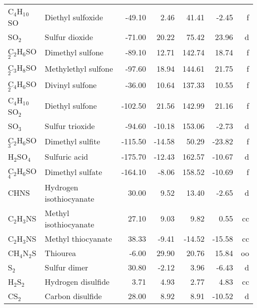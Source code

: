 \begin{table}
\begin{center}
\begin{tabular}{llrrrrr}
 C$_4$H$_1$$_0$SO     & Diethyl sulfoxide               &   -49.10    &     2.46  &    41.41  &    -2.45  &      f\\
 SO$_2$         & Sulfur dioxide                  &   -71.00    &    20.22  &    75.42  &    23.96  &      d\\
 C$_2$H$_6$SO$_2$     & Dimethyl sulfone                &   -89.10    &    12.71  &   142.74  &    18.74  &      f\\
 C$_3$H$_8$SO$_2$     & Methylethyl sulfone             &   -97.60    &    18.94  &   144.61  &    21.75  &      f\\
 C$_4$H$_6$SO$_2$     & Divinyl sulfone                 &   -36.00    &    10.64  &   137.33  &    10.55  &      f\\
 C$_4$H$_1$$_0$SO$_2$    & Diethyl sulfone                 &  -102.50    &    21.56  &   142.99  &    21.16  &      f\\
 SO$_3$         & Sulfur trioxide                 &   -94.60    &   -10.18  &   153.06  &    -2.73  &      d\\
 C$_2$H$_6$SO$_3$     & Dimethyl sulfite                &  -115.50    &   -14.58  &    50.29  &   -23.82  &      f\\
 H$_2$SO$_4$       & Sulfuric acid                   &  -175.70    &   -12.43  &   162.57  &   -10.67  &      d\\
 C$_2$H$_6$SO$_4$     & Dimethyl sulfate                &  -164.10    &    -8.06  &   158.52  &   -10.69  &      f\\
 CHNS        & Hydrogen isothiocyanate         &    30.00    &     9.52  &    13.40  &    -2.65  &      d\\
 C$_2$H$_3$NS      & Methyl isothiocyanate           &    27.10    &     9.03  &     9.82  &     0.55  &     cc\\
 C$_2$H$_3$NS      & Methyl thiocyanate              &    38.33    &    -9.41  &   -14.52  &   -15.58  &     cc\\
 CH$_4$N$_2$S      & Thiourea                        &    -6.00    &    29.90  &    20.76  &    15.84  &     oo\\
 S$_2$          & Sulfur dimer                    &    30.80    &    -2.12  &     3.96  &    -6.43  &      d\\
 H$_2$S$_2$        & Hydrogen disulfide              &     3.71    &     4.93  &     2.77  &     4.83  &     cc\\
 CS$_2$         & Carbon disulfide                &    28.00    &     8.92  &     8.91  &   -10.52  &      d\\

\end{tabular}
\end{center}
\end{table}
